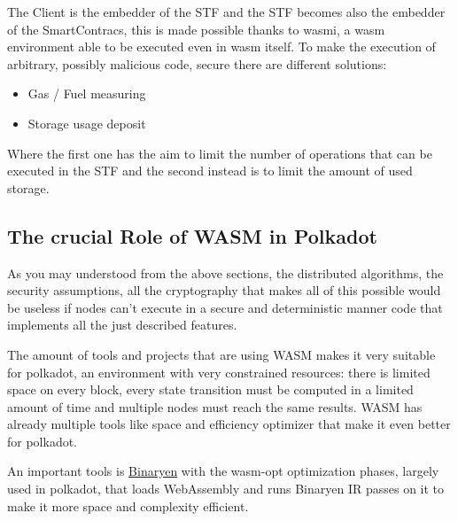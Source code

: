 \documentclass[../main.tex]{subfiles}
\begin{document}
The Client is the embedder of the STF and the STF becomes also the embedder of the SmartContracs, this is made possible thanks to wasmi, a wasm environment able to be executed even in wasm itself. To make the execution of arbitrary, possibly malicious code, secure there are different solutions:

\begin{itemize}
  \item Gas / Fuel measuring
  \item Storage usage deposit
\end{itemize}

Where the first one has the aim to limit the number of operations that can be executed in the STF and the second instead is to limit the amount of used storage.

\subsection{The crucial Role of WASM in Polkadot}

As you may understood from the above sections, the distributed algorithms, the security assumptions, all the cryptography that makes all of this possible would be useless if nodes can't execute in a secure and deterministic manner code that implements all the just described features.

The amount of tools and projects that are using WASM makes it very suitable for polkadot, an environment with very constrained resources: there is limited space on every block, every state transition must be computed in a limited amount of time and multiple nodes must reach the same results. WASM has already multiple tools like space and efficiency optimizer that make it even better for polkadot.

An important tools is \href{https://github.com/WebAssembly/binaryen}{Binaryen} with the wasm-opt optimization phases, largely used in polkadot, that loads WebAssembly and runs Binaryen IR passes on it to make it more space and complexity efficient.

\end{document}
